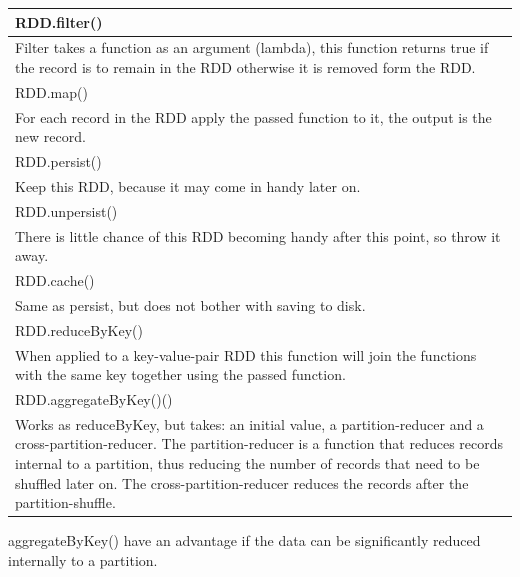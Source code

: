 \documentclass[abstract=on]{article}
\begin{document}
\begin{center}
\begin{tabularx}{0.75\textwidth}{ |X| }
\hline
\cellcolor[gray]{0.9}
RDD.filter() \\ \hline
Filter takes a function as an argument (lambda), this function returns true 
if the record is to remain in the RDD otherwise it is removed form the RDD. 
\\ \hline
\hline
\cellcolor[gray]{0.9}
RDD.map() \\ \hline
For each record in the RDD apply the passed function to it, the output is the 
 new record.
\\ \hline
\hline
\cellcolor[gray]{0.9}
RDD.persist() \\ \hline
Keep this RDD, because it may come in handy later on.
\\ \hline
\hline
\cellcolor[gray]{0.9}
RDD.unpersist() \\ \hline
There is little chance of this RDD becoming handy after this point, so throw it 
away.
\\ \hline
\hline
\cellcolor[gray]{0.9}
RDD.cache() \\ \hline
Same as persist, but does not bother with saving to disk.
\\ \hline
\hline
\cellcolor[gray]{0.9}
RDD.reduceByKey() \\ \hline
When applied to a key-value-pair RDD this function will join the functions with 
the same key together using the passed
function.
\\ \hline
\hline
\cellcolor[gray]{0.9}
RDD.aggregateByKey()() \\ \hline
Works as reduceByKey, but takes: an initial value, a partition-reducer and a 
cross-partition-reducer. The partition-reducer is a function that reduces 
records internal to a partition, thus reducing the number of records that need 
to be shuffled later on. The cross-partition-reducer reduces the records after 
the partition-shuffle.
\\ \hline
\end{tabularx}

\end{center}
aggregateByKey() have an advantage if the data can be significantly reduced internally to a partition.
\end{document}

